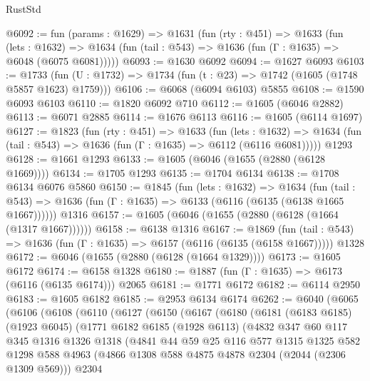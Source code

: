 \begin{lexlean}{RustStd}
\begin{coremodule}
@6092 := fun (params : @1629) =>
  @1631
    (fun (rty : @451) =>
    @1633
      (fun (lets : @1632) =>
      @1634 (fun (tail : @543) => @1636 (fun (Γ : @1635) => @6048 (@6075 @6081)))))
@6093 := @1630 @6092
@6094 := @1627 @6093
@6103 := @1733 (fun (U : @1732) => @1734 (fun (t : @23) => @1742 (@1605 (@1748 @5857 @1623) @1759)))
@6106 := @6068 (@6094 @6103) @5855
@6108 := @1590 @6093 @6103
@6110 := @1820 @6092 @710
@6112 := @1605 (@6046 @2882)
@6113 := @6071 @2885
@6114 := @1676 @6113
@6116 := @1605 (@6114 @1697)
@6127 := @1823
    (fun (rty : @451) =>
    @1633
      (fun (lets : @1632) =>
      @1634 (fun (tail : @543) => @1636 (fun (Γ : @1635) => @6112 (@6116 @6081)))))
    @1293
@6128 := @1661 @1293
@6133 := @1605 (@6046 (@1655 (@2880 (@6128 @1669))))
@6134 := @1705 @1293
@6135 := @1704 @6134
@6138 := @1708 @6134 @6076 @5860
@6150 := @1845
    (fun (lets : @1632) =>
    @1634
      (fun (tail : @543) => @1636 (fun (Γ : @1635) => @6133 (@6116 (@6135 (@6138 @1665 @1667))))))
    @1316
@6157 := @1605 (@6046 (@1655 (@2880 (@6128 (@1664 (@1317 @1667))))))
@6158 := @6138 @1316
@6167 := @1869
    (fun (tail : @543) => @1636 (fun (Γ : @1635) => @6157 (@6116 (@6135 (@6158 @1667)))))
    @1328
@6172 := @6046 (@1655 (@2880 (@6128 (@1664 @1329))))
@6173 := @1605 @6172
@6174 := @6158 @1328
@6180 := @1887 (fun (Γ : @1635) => @6173 (@6116 (@6135 @6174))) @2065
@6181 := @1771 @6172
@6182 := @6114 @2950
@6183 := @1605 @6182
@6185 := @2953 @6134 @6174
@6262 := @6040
    (@6065
      (@6106
        (@6108
          (@6110
            (@6127
              (@6150
                (@6167
                  (@6180
                    (@6181
                      (@6183 @6185)
                      (@1923 @6045)
                      (@1771
                        @6182
                        @6185
                        (@1928 @6113)
                        (@4832
                          @347
                          @60
                          @117
                          @345
                          @1316
                          @1326
                          @1318
                          (@4841
                            @44
                            @59
                            @25
                            @116
                            @577
                            @1315
                            @1325
                            @582
                            @1298
                            @588
                            @4963
                            (@4866 @1308 @588 @4875 @4878 @2304 (@2044 (@2306 @1309 @569)))
                            @2304

\end{coremodule}
\end{lexlean}
